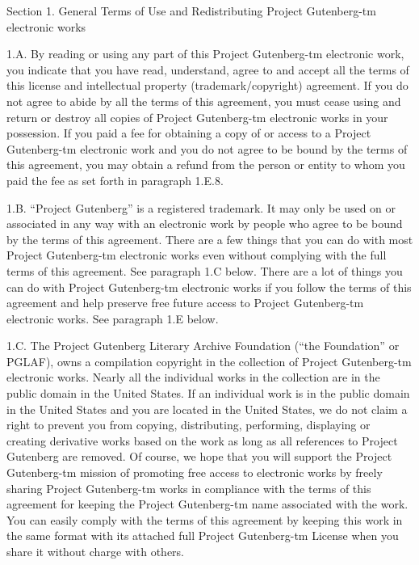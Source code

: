\documentclass[12pt,oneside]{scrbook}
\begin{document}
  Section 1. General Terms of Use and Redistributing Project Gutenberg-tm
  electronic works
  
  1.A. By reading or using any part of this Project Gutenberg-tm
  electronic work, you indicate that you have read, understand, agree to
  and accept all the terms of this license and intellectual property
  (trademark/copyright) agreement. If you do not agree to abide by all the
  terms of this agreement, you must cease using and return or destroy all
  copies of Project Gutenberg-tm electronic works in your possession. If
  you paid a fee for obtaining a copy of or access to a Project
  Gutenberg-tm electronic work and you do not agree to be bound by the
  terms of this agreement, you may obtain a refund from the person or
  entity to whom you paid the fee as set forth in paragraph 1.E.8.
  
  1.B. ``Project Gutenberg'' is a registered trademark. It may only be
  used on or associated in any way with an electronic work by people who
  agree to be bound by the terms of this agreement. There are a few things
  that you can do with most Project Gutenberg-tm electronic works even
  without complying with the full terms of this agreement. See paragraph
  1.C below. There are a lot of things you can do with Project
  Gutenberg-tm electronic works if you follow the terms of this agreement
  and help preserve free future access to Project Gutenberg-tm electronic
  works. See paragraph 1.E below.
  
  1.C. The Project Gutenberg Literary Archive Foundation (``the
  Foundation'' or PGLAF), owns a compilation copyright in the collection
  of Project Gutenberg-tm electronic works. Nearly all the individual
  works in the collection are in the public domain in the United States.
  If an individual work is in the public domain in the United States and
  you are located in the United States, we do not claim a right to prevent
  you from copying, distributing, performing, displaying or creating
  derivative works based on the work as long as all references to Project
  Gutenberg are removed. Of course, we hope that you will support the
  Project Gutenberg-tm mission of promoting free access to electronic
  works by freely sharing Project Gutenberg-tm works in compliance with
  the terms of this agreement for keeping the Project Gutenberg-tm name
  associated with the work. You can easily comply with the terms of this
  agreement by keeping this work in the same format with its attached full
  Project Gutenberg-tm License when you share it without charge with
  others.
  
\end{document}
